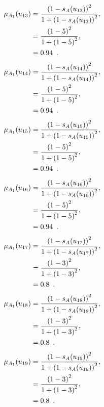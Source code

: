 \documentclass[a4paper,openany]{book}
\begin{document}
				\begin{align}
					\mu_{A_1}(u_{13}) &= \frac{\left(1-s_A(u_{13})\right)^2}{1 + \left(1-s_A(u_{13})\right)^2} ,\\
					&= \frac{\left(1-5\right)^2}{1 + \left(1-5\right)^2} \notag ,\\
					&= 0.94 \enspace. \notag
				\end{align}
				\begin{align}
					\mu_{A_1}(u_{14}) &= \frac{\left(1-s_A(u_{14})\right)^2}{1 + \left(1-s_A(u_{14})\right)^2} ,\\
					&= \frac{\left(1-5\right)^2}{1 + \left(1-5\right)^2} \notag ,\\
					&= 0.94 \enspace. \notag
				\end{align}
				\begin{align}
					\mu_{A_1}(u_{15}) &= \frac{\left(1-s_A(u_{15})\right)^2}{1 + \left(1-s_A(u_{15})\right)^2} ,\\
					&= \frac{\left(1-5\right)^2}{1 + \left(1-5\right)^2} \notag ,\\
					&= 0.94 \enspace. \notag
				\end{align}
				\begin{align}
					\mu_{A_1}(u_{16}) &= \frac{\left(1-s_A(u_{16})\right)^2}{1 + \left(1-s_A(u_{16})\right)^2} ,\\
					&= \frac{\left(1-5\right)^2}{1 + \left(1-5\right)^2} \notag ,\\
					&= 0.94 \enspace. \notag
				\end{align}
				\begin{align}
					\mu_{A_1}(u_{17}) &= \frac{\left(1-s_A(u_{17})\right)^2}{1 + \left(1-s_A(u_{17})\right)^2} ,\\
					&= \frac{\left(1-3\right)^2}{1 + \left(1-3\right)^2} \notag ,\\
					&= 0.8 \enspace. \notag
				\end{align}
				\begin{align}
					\mu_{A_1}(u_{18}) &= \frac{\left(1-s_A(u_{18})\right)^2}{1 + \left(1-s_A(u_{18})\right)^2} ,\\
					&= \frac{\left(1-3\right)^2}{1 + \left(1-3\right)^2} \notag ,\\
					&= 0.8 \enspace. \notag
				\end{align}
				\begin{align}
					\mu_{A_1}(u_{19}) &= \frac{\left(1-s_A(u_{19})\right)^2}{1 + \left(1-s_A(u_{19})\right)^2} ,\\
					&= \frac{\left(1-3\right)^2}{1 + \left(1-3\right)^2} \notag ,\\
					&= 0.8 \enspace. \notag
				\end{align}
\end{document}
